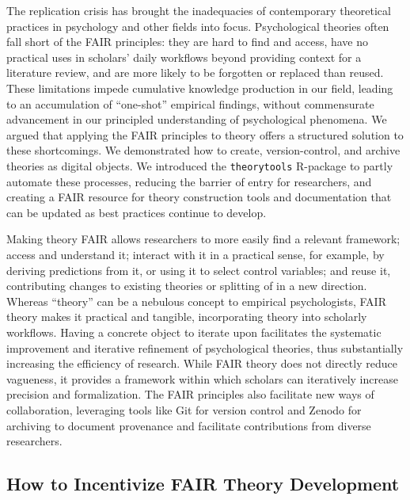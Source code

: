 \documentclass[man]{apa7}
\begin{document}
The replication crisis has brought the inadequacies of contemporary theoretical practices in psychology and other fields into focus.
Psychological theories often fall short of the FAIR principles:
they are hard to find and access, have no practical uses in scholars' daily workflows beyond providing context for a literature review,
and are more likely to be forgotten or replaced than reused.
These limitations impede cumulative knowledge production in our field,
leading to an accumulation of ``one-shot'' empirical findings, without commensurate advancement in our principled understanding of psychological phenomena.
We argued that applying the FAIR principles to theory offers a structured solution to these shortcomings.
We demonstrated how to create, version-control, and archive theories as digital objects.
We introduced the \texttt{theorytools} R-package to partly automate these processes, reducing the barrier of entry for researchers,
and creating a FAIR resource for theory construction tools and documentation that can be updated as best practices continue to develop.

Making theory FAIR allows researchers to more easily find a relevant framework;
access and understand it; interact with it in a practical sense, for example, by deriving predictions from it, or using it to select control variables; and reuse it, contributing changes to existing theories or splitting of in a new direction.
Whereas ``theory'' can be a nebulous concept to empirical psychologists,
FAIR theory makes it practical and tangible, incorporating theory into scholarly workflows.
Having a concrete object to iterate upon facilitates the systematic improvement and iterative refinement of psychological theories, thus substantially increasing the efficiency of research.
While FAIR theory does not directly reduce vagueness,
it provides a framework within which scholars can iteratively increase precision and formalization.
The FAIR principles also facilitate new ways of collaboration,
leveraging tools like Git for version control and Zenodo for archiving to document provenance and facilitate contributions from diverse researchers.

\subsection{How to Incentivize FAIR Theory Development}\label{how-to-incentivize-fair-theory-development}
\end{document}
